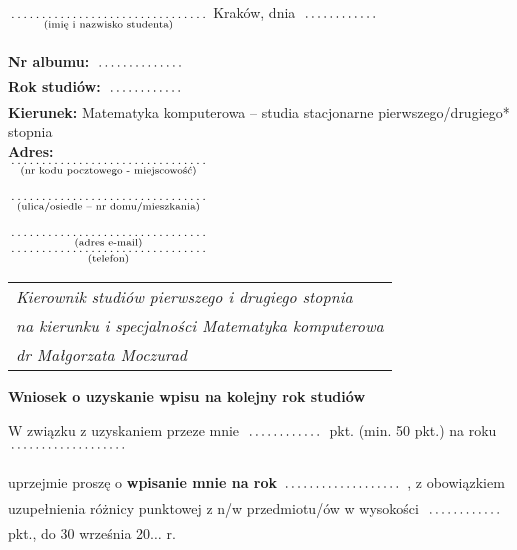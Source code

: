 \documentclass[a4paper,11pt]{article}
\newcommand{\fillField}[2]{
    $\underset{\text{#1}}{\parbox[t]{#2}{\dotfill}}$
}
\begin{document}
\noindent
\fillField{(imię i nazwisko studenta)}{5cm} \hfill Kraków, dnia \fillField{}{2cm} \\\\
\textbf{Nr albumu:}   \fillField{}{2.3cm}\\
\textbf{Rok studiów:} \fillField{}{2cm}\\
\textbf{Kierunek:} Matematyka komputerowa -- studia stacjonarne pierwszego/drugiego* stopnia\\
\textbf{Adres:}\\
\fillField{(nr kodu pocztowego - miejscowość)}{5cm}\\\\
\fillField{(ulica/osiedle – nr domu/mieszkania)}{5cm}\\\\
\fillField{(adres e-mail)}{5cm}\\
\fillField{(telefon)}{5cm}
\phantom{a}\hfill
\begin{tabular}[c]{@{}l@{}}
\textit{Kierownik studiów pierwszego i drugiego stopnia} \\
\textit{na kierunku i specjalności Matematyka komputerowa}\\
\textit{dr Małgorzata Moczurad}
\end{tabular}

\vskip 1.0cm

\begin{center}
{\Large \textbf{Wniosek o uzyskanie wpisu na kolejny rok studiów}}
\end{center}

\vskip 0.5cm

\noindent
W związku z uzyskaniem przeze mnie \fillField{}{2cm} pkt. (min. 50 pkt.) na roku \fillField{}{3cm}
uprzejmie proszę o \textbf{wpisanie mnie na rok} \fillField{}{3cm}, z obowiązkiem uzupełnienia różnicy punktowej z n/w przedmiotu/ów
 w wysokości \fillField{}{2cm} pkt., do 30 września 20$\ldots$ r.
\end{document}
